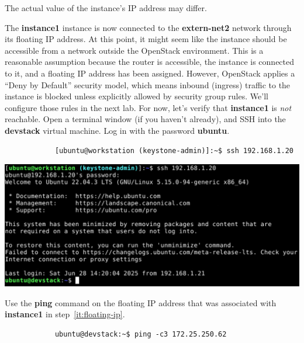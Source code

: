 \documentclass[letterpaper, 12pt]{article}
\begin{document}
\begin{enumerate}
    \begin{notebox}
        The actual value of the instance's IP address may differ.
    \end{notebox}

    \begin{labstep}
        The \textbf{instance1} instance is now connected to the \textbf{extern-net2} network through its floating IP address.
        At this point, it might seem like the instance should be accessible from a network outside the OpenStack environment.
        This is a reasonable assumption because the router is accessible, the instance is connected to it, and a floating IP address has been assigned.
        However, OpenStack applies a ``Deny by Default'' security model, which means inbound (ingress) traffic to the instance is blocked unless explicitly allowed by security group rules.
        We'll configure those rules in the next lab.
        For now, let's verify that \textbf{instance1} is \textit{not} reachable.
        Open a terminal window (if you haven't already), and SSH into the \textbf{devstack} virtual machine.
        Log in with the password \textbf{ubuntu}.
        \begin{lstlisting}
            [ubuntu@workstation (keystone-admin)]:~$ ssh 192.168.1.20
        \end{lstlisting}

        \begin{center}
            \includegraphics[width=\linewidth]{images/part3/step8.png}
        \end{center}
    \end{labstep}

    \begin{labstep}
        Use the \textbf{ping} command on the floating IP address that was associated with \textbf{instance1} in step~\ref{it:floating-ip}.
        \begin{lstlisting}
            ubuntu@devstack:~$ ping -c3 172.25.250.62
        \end{lstlisting}


\end{labstep}
\end{enumerate}
\end{document}
